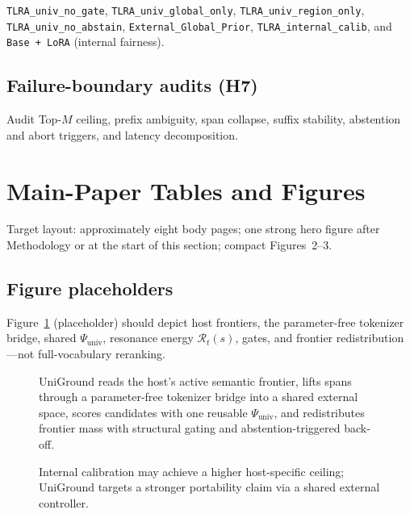 \texttt{TLRA\_univ\_no\_gate}, \texttt{TLRA\_univ\_global\_only}, \texttt{TLRA\_univ\_region\_only}, \texttt{TLRA\_univ\_no\_abstain}, \texttt{External\_Global\_Prior}, \texttt{TLRA\_internal\_calib}, and \texttt{Base + LoRA} (internal fairness).

\subsection{Failure-boundary audits (H7)}

Audit Top-$M$ ceiling, prefix ambiguity, span collapse, suffix stability, abstention and abort triggers, and latency decomposition.

\section{Main-Paper Tables and Figures}
\label{sec:tables}

Target layout: approximately eight body pages; one strong hero figure after Methodology or at the start of this section; compact Figures~2--3.

\subsection{Figure placeholders}

Figure~\ref{fig:hero} (placeholder) should depict host frontiers, the parameter-free tokenizer bridge, shared $\Psi_{\mathrm{univ}}$, resonance energy $\mathcal{R}_t(s)$, gates, and frontier redistribution---not full-vocabulary reranking.

\begin{figure}[t]
  \centering
  \caption{UniGround reads the host's active semantic frontier, lifts spans through a parameter-free tokenizer bridge into a shared external space, scores candidates with one reusable $\Psi_{\mathrm{univ}}$, and redistributes frontier mass with structural gating and abstention-triggered back-off.}
  \label{fig:hero}
\end{figure}

\begin{figure}[t]
  \centering
  \caption{Internal calibration may achieve a higher host-specific ceiling; UniGround targets a stronger portability claim via a shared external controller.}
  \label{fig:tradeoff}
\end{figure}

